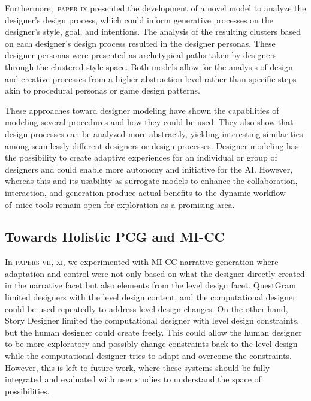 


Furthermore,~\textsc{paper ix} presented the development of a novel model to analyze the designer's design process, which could inform generative processes on the designer's style, goal, and intentions. The analysis of the resulting clusters based on each designer's design process resulted in the designer personas. These designer personas were presented as archetypical paths taken by designers through the clustered style space. Both models allow for the analysis of design and creative processes from a higher abstraction level rather than specific steps akin to procedural personas or game design patterns. 

These approaches toward designer modeling have shown the capabilities of modeling several procedures and how they could be used. They also show that design processes can be analyzed more abstractly, yielding interesting similarities among seamlessly different designers or design processes. Designer modeling has the possibility to create adaptive experiences for an individual or group of designers and could enable more autonomy and initiative for the AI. However, whereas this and its usability as surrogate models to enhance the collaboration, interaction, and generation produce actual benefits to the dynamic workflow of~\acrshort{micc} tools remain open for exploration as a promising area.

\subsection{Towards Holistic PCG and MI-CC}

In \textsc{papers vii, xi}, we experimented with MI-CC narrative generation where adaptation and control were not only based on what the designer directly created in the narrative facet but also elements from the level design facet. QuestGram limited designers with the level design content, and the computational designer could be used repeatedly to address level design changes. On the other hand, Story Designer limited the computational designer with level design constraints, but the human designer could create freely. This could allow the human designer to be more exploratory and possibly change constraints back to the level design while the computational designer tries to adapt and overcome the constraints. However, this is left to future work, where these systems should be fully integrated and evaluated with user studies to understand the space of possibilities.

